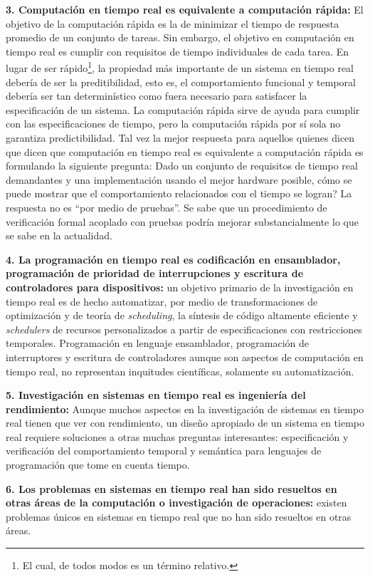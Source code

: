 \textbf{3. Computación en tiempo real es equivalente a computación rápida:} El objetivo de la computación rápida es la de minimizar el tiempo de respuesta promedio de un conjunto de tareas. Sin embargo, el objetivo en computación en tiempo real es cumplir con requisitos de tiempo individuales de cada tarea. En lugar de ser rápido\footnote{El cual, de todos modos es un término relativo.}, la propiedad más importante de un sistema en tiempo real debería de ser la preditibilidad, esto es, el comportamiento funcional y temporal debería ser tan determinístico como fuera necesario para satisfacer la especificación de un sistema. La computación rápida sirve de ayuda para cumplir con las especificaciones de tiempo, pero la computación rápida por sí sola no garantiza predictibilidad. Tal vez la mejor respuesta para aquellos quienes dicen que  dicen que computación en tiempo real es equivalente a computación rápida es formulando la siguiente pregunta: Dado un conjunto de requisitos de tiempo real demandantes y una implementación usando el mejor hardware posible, cómo se puede mostrar que el comportamiento relacionados con el tiempo se logran? La respuesta no es ``por medio de pruebas''. Se sabe que un procedimiento de verificación formal acoplado con pruebas podría mejorar substancialmente lo que se sabe en la actualidad. 

\textbf{4. La programación en tiempo real es codificación en ensamblador, programación de prioridad de interrupciones y escritura de controladores para dispositivos:} un objetivo primario de la investigación en tiempo real es de hecho automatizar, por medio de transformaciones de optimización y de teoría de \emph{scheduling}, la síntesis de código altamente eficiente y \emph{schedulers} de recursos personalizados a partir de especificaciones con restricciones temporales. Programación en lenguaje ensamblador, programación de interruptores y escritura de controladores aunque son aspectos de computación en tiempo real, no representan inquitudes científicas, solamente su automatización. 

\textbf{5. Investigación en sistemas en tiempo real es ingeniería del rendimiento:} Aunque muchos aspectos en la investigación de sistemas en tiempo real tienen que ver con rendimiento, un diseño apropiado de un sistema en tiempo real requiere soluciones a otras muchas preguntas interesantes: especificación y verificación del comportamiento temporal y semántica para lenguajes de programación que tome en cuenta tiempo. 

\textbf{6. Los problemas en sistemas en tiempo real han sido resueltos en otras áreas de la computación o investigación de operaciones:}  existen problemas únicos en sistemas en tiempo real que no han sido resueltos en otras áreas. 

